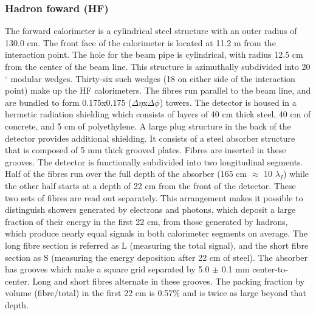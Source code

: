 \subsubsection{Hadron foward (HF)}
The forward calorimeter is a cylindrical steel structure with an outer radius of 130.0 cm. The front face of the calorimeter is located at 11.2 m from the interaction point. The hole for the beam pipe is cylindrical, with radius 12.5 cm from the center of the beam line. This structure is azimuthally subdivided into 20$^\circ$ modular wedges. Thirty-six such wedges (18 on either side of the interaction point) make up the HF calorimeters. The fibres run parallel to the beam line, and are bundled to form 0.175x0.175 ($\Delta \eta$x$\Delta \phi$) towers. The detector is housed in a hermetic radiation shielding which consists of layers of 40 cm thick steel, 40 cm of concrete, and 5 cm of polyethylene. A large plug structure in the back of the detector provides additional shielding. It consists of a steel absorber structure that is composed of 5 mm thick grooved plates. Fibres are inserted in these grooves. The detector is functionally subdivided into two longitudinal segments. Half of the fibres run over the full depth of the absorber (165 cm $\approx$ 10 $\lambda_{I}$) while the other half starts at a depth of 22 cm from the front of the detector. These two sets of fibres are read out separately. This arrangement makes it possible to distinguish showers generated by electrons and photons, which deposit a large fraction of their energy in the first 22 cm, from those generated by hadrons, which produce nearly equal signals in both calorimeter segments on average. The long fibre section is referred as L (measuring the total signal), and the short fibre section as S (measuring the energy deposition after 22 cm of steel). The absorber has grooves which make a square grid separated by 5.0 $\pm$ 0.1 mm center-to-center. Long and short fibres alternate in these grooves. The packing fraction by volume (fibre/total) in the first 22 cm is 0.57\% and is twice as large beyond that depth.

